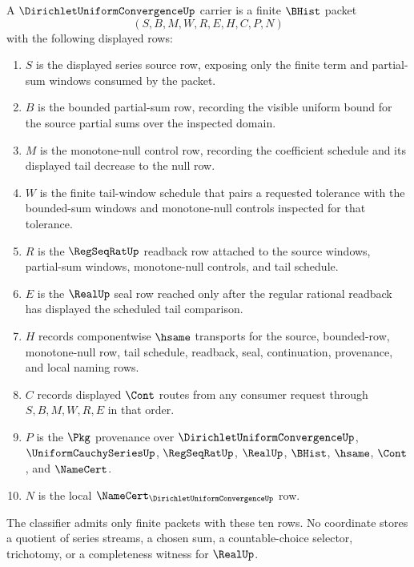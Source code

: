 \begin{definition}\label{def:dirichlet-uniform-convergence-carrier}
A $\DirichletUniformConvergenceUp$ carrier is a finite $\BHist$ packet
$$
(S,B,M,W,R,E,H,C,P,N)
$$
with the following displayed rows:
\begin{enumerate}
\item $S$ is the displayed series source row, exposing only the finite term and partial-sum windows consumed by the packet.
\item $B$ is the bounded partial-sum row, recording the visible uniform bound for the source partial sums over the inspected domain.
\item $M$ is the monotone-null control row, recording the coefficient schedule and its displayed tail decrease to the null row.
\item $W$ is the finite tail-window schedule that pairs a requested tolerance with the bounded-sum windows and monotone-null controls inspected for that tolerance.
\item $R$ is the $\RegSeqRatUp$ readback row attached to the source windows, partial-sum windows, monotone-null controls, and tail schedule.
\item $E$ is the $\RealUp$ seal row reached only after the regular rational readback has displayed the scheduled tail comparison.
\item $H$ records componentwise $\hsame$ transports for the source, bounded-row, monotone-null row, tail schedule, readback, seal, continuation, provenance, and local naming rows.
\item $C$ records displayed $\Cont$ routes from any consumer request through $S,B,M,W,R,E$ in that order.
\item $P$ is the $\Pkg$ provenance over $\DirichletUniformConvergenceUp$, $\UniformCauchySeriesUp$, $\RegSeqRatUp$, $\RealUp$, $\BHist$, $\hsame$, $\Cont$, and $\NameCert$.
\item $N$ is the local $\NameCert_{\DirichletUniformConvergenceUp}$ row.
\end{enumerate}
The classifier admits only finite packets with these ten rows. No coordinate stores a quotient of series streams, a chosen sum, a countable-choice selector, trichotomy, or a completeness witness for $\RealUp$.
\end{definition}

